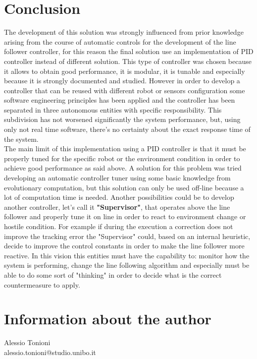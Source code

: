 \documentclass{llncs}
\newcommand{\labelsec}[1]{\label{sec:#1}}
\begin{document}
\section{Conclusion}
\labelsec{Conclusion}
The development of this solution was strongly influenced from prior knowledge arising from the course of automatic controls for the development of the line follower controller, for this reason the final solution use an implementation of PID controller instead of different solution. This type of controller was chosen because it allows to obtain good performance, it is modular, it is tunable and especially because it is strongly documented and studied. However in order to develop a controller that can be reused with different robot or sensors configuration some software engineering principles has been applied and the controller has been separated in three autonomous entities with specific responsibility. This subdivision has not worsened significantly the system performance, but, using only not real time software, there's no certainty about the exact response time of the system.\\ 
The main limit of this implementation using a PID controller is that it must be properly tuned for the specific robot or the environment condition in order to achieve good performance as said above. A solution for this problem was tried developing an automatic controller tuner using some basic knowledge from evolutionary computation, but this solution can only be used off-line because a lot of computation time is needed. Another possibilities could be to develop another controller, let's call it \textbf{"Supervisor"}, that operates above the line follower and properly tune it on line in order to react to environment change or hostile condition. For example if during the execution a correction does not improve the tracking error the "Supervisor" could, based on an internal heuristic, decide to improve the control constants in order to make the line follower more reactive. In this vision this entities must have the capability to: monitor how the system is performing, change the line following algorithm and especially must be able to do some sort of "thinking" in order to decide what is the correct countermeasure to apply.
\newpage

\section{Information about the author}
\labelsec{Author}
Alessio Tonioni \\
alessio.tonioni@studio.unibo.it
\end{document}
